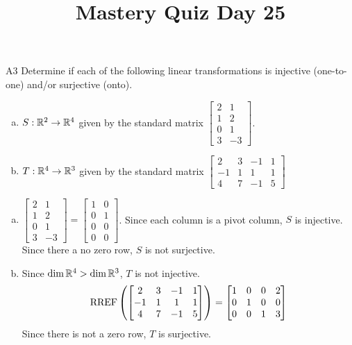 \documentclass{sbgLAquiz}
\title{Mastery Quiz Day 25 }
\begin{document}
\begin{problem}{A3}
Determine if each of the following linear transformations is injective (one-to-one) and/or surjective (onto).
\begin{enumerate}[(a)]
\item $S: \mathbb{R}^2 \rightarrow \mathbb{R}^4$ given by the standard matrix $\begin{bmatrix} 2 & 1 \\ 1 & 2 \\ 0 & 1 \\ 3 & -3 \end{bmatrix}$.
\item $T: \mathbb{R}^4 \rightarrow \mathbb{R}^3$ given by the standard matrix $\begin{bmatrix} 2 & 3 & -1 & 1 \\ -1 & 1 & 1 & 1 \\ 4 & 7 & -1 & 5 \end{bmatrix}$
\end{enumerate}
\end{problem}
\begin{solution}
\begin{enumerate}[(a)]
\item $ \begin{bmatrix} 2 & 1 \\ 1 & 2 \\ 0 & 1 \\ 3 & -3 \end{bmatrix}=\begin{bmatrix}1 & 0 \\ 0 & 1 \\ 0 & 0 \\ 0 & 0  \end{bmatrix}$.  Since each column is a pivot column, $S$ is injective.  Since there a no zero row, $S$ is not surjective.
\item Since $\dim \mathbb{R}^4 > \dim \mathbb{R}^3$, $T$ is not injective.
$$\operatorname{RREF}\left(\begin{bmatrix} 2 & 3 & -1 & 1 \\ -1 & 1 & 1 & 1 \\ 4 & 7 & -1 & 5 \end{bmatrix}\right) = \begin{bmatrix} 1 & 0  & 0 & 2 \\ 0 & 1 & 0 & 0  \\ 0 & 0 & 1 & 3 \end{bmatrix}$$
Since there is not a zero row, $T$ is surjective.
\end{enumerate}
\end{solution}
\end{document}

